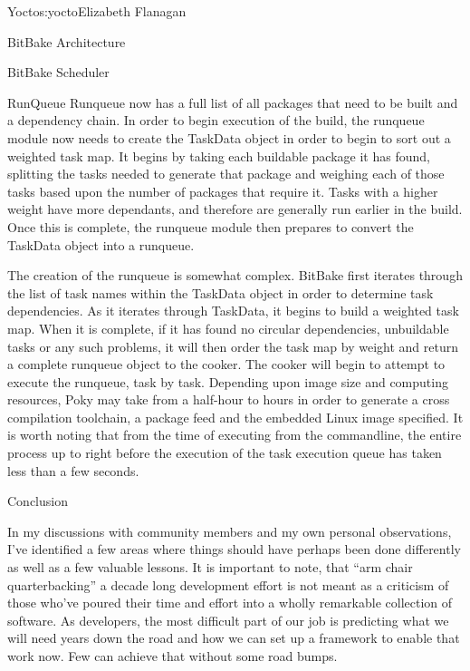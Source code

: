\begin{aosachapter}{Yocto}{s:yocto}{Elizabeth Flanagan}
\begin{aosasect1}{BitBake Architecture}
\begin{aosasect2}{BitBake Scheduler}
\begin{aosasect3}{RunQueue}
Runqueue now has a full list of all packages that need to be built and a
dependency chain. In order to begin execution of the build, the
runqueue module now needs to create the TaskData object in order to
begin to sort out a weighted task map. It begins by taking each
buildable package it has found, splitting the tasks needed to
generate that package and weighing each of those tasks based upon the
number of packages that require it. Tasks with a higher weight have
more dependants, and therefore are generally run earlier in the
build. Once this is complete, the runqueue module then prepares to
convert the TaskData object into a runqueue.

The creation of the runqueue is somewhat complex. BitBake first
iterates through the list of task names within the TaskData object in
order to determine task dependencies. As it iterates through TaskData,
it begins to build a weighted task map. When it is complete, if it has
found no circular dependencies, unbuildable tasks or any such
problems, it will then order the task map by weight and return a
complete runqueue object to the cooker. The cooker will begin to
attempt to execute the runqueue, task by task. Depending upon image
size and computing resources, Poky may take from a half-hour to hours
in order to generate a cross compilation toolchain, a package feed and
the embedded Linux image specified. It is worth noting that from the
time of executing  from the commandline,
the entire process up to right before the execution of the task
execution queue has taken less than a few seconds.

\end{aosasect3}

\end{aosasect2}

\end{aosasect1}

\begin{aosasect1}{Conclusion}

In my discussions with community members and my own personal
observations, I've identified a few areas where things should have
perhaps been done differently as well as a few valuable lessons. It is
important to note, that ``arm chair quarterbacking'' a decade long
development effort is not meant as a criticism of those who've poured
their time and effort into a wholly remarkable collection of
software. As developers, the most difficult part of our job is
predicting what we will need years down the road and how we can set up
a framework to enable that work now. Few can achieve that without
some road bumps.


\end{aosasect1}
\end{aosachapter}
